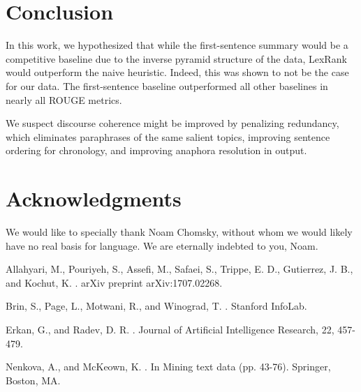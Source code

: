 \documentclass[11pt]{article}
\begin{document}
\section{Conclusion}
\label{sec:length}

In this work, we hypothesized that while the first-sentence summary would be a competitive baseline due to the inverse pyramid structure of the data, LexRank would outperform the naive heuristic. Indeed, this was shown to not be the case for our data. The first-sentence baseline outperformed all other baselines in nearly all ROUGE metrics.

We suspect discourse coherence might be improved by penalizing redundancy, which eliminates paraphrases of the same salient topics, improving sentence ordering for chronology, and improving anaphora resolution in output. 


\section*{Acknowledgments}

We would like to specially thank Noam Chomsky, without whom we would likely have no real basis for language. We are eternally indebted to you, Noam.

%
%

\begin{thebibliography}{}
Allahyari, M., Pouriyeh, S., Assefi, M., Safaei, S., Trippe, E. D., Gutierrez, J. B., and Kochut, K.
.
\newblock arXiv preprint arXiv:1707.02268.

Brin, S., Page, L., Motwani, R., and Winograd, T.
.
\newblock Stanford InfoLab.

Erkan, G., and Radev, D. R.
.
\newblock Journal of Artificial Intelligence Research, 22, 457-479.

Nenkova, A., and McKeown, K.
.
\newblock In Mining text data (pp. 43-76). Springer, Boston, MA.


\end{thebibliography}
\end{document}
